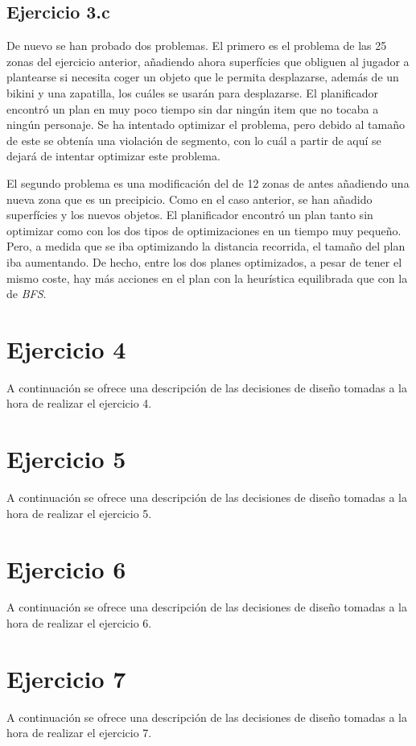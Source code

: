 \documentclass[11pt,a4paper]{article}
\begin{document}
\subsection{Ejercicio 3.c}

De nuevo se han probado dos problemas. El primero es el problema de las 25 zonas del ejercicio anterior, añadiendo ahora
superfícies que obliguen al jugador a plantearse si necesita coger un objeto que le permita desplazarse, además de un bikini y una
zapatilla, los cuáles se usarán para desplazarse. El planificador encontró un plan en muy poco tiempo sin dar ningún item que no
tocaba a ningún personaje. Se ha intentado optimizar el problema, pero debido al tamaño de este se obtenía una violación de segmento,
con lo cuál a partir de aquí se dejará de intentar optimizar este problema.

El segundo problema es una modificación del de 12 zonas de antes añadiendo una nueva zona que es un precipicio. Como en el caso
anterior, se han añadido superfícies y los nuevos objetos. El planificador encontró un plan tanto sin optimizar como con los dos
tipos de optimizaciones en un tiempo muy pequeño. Pero, a medida que se iba optimizando la distancia recorrida, el tamaño del plan
iba aumentando. De hecho, entre los dos planes optimizados, a pesar de tener el mismo coste, hay más acciones en el plan con la
heurística equilibrada que con la de \textit{BFS}.

\section{Ejercicio 4}

A continuación se ofrece una descripción de las decisiones de diseño tomadas a la hora de realizar el ejercicio 4.

\section{Ejercicio 5}

A continuación se ofrece una descripción de las decisiones de diseño tomadas a la hora de realizar el ejercicio 5.

\section{Ejercicio 6}

A continuación se ofrece una descripción de las decisiones de diseño tomadas a la hora de realizar el ejercicio 6.

\section{Ejercicio 7}

A continuación se ofrece una descripción de las decisiones de diseño tomadas a la hora de realizar el ejercicio 7.
\end{document}
